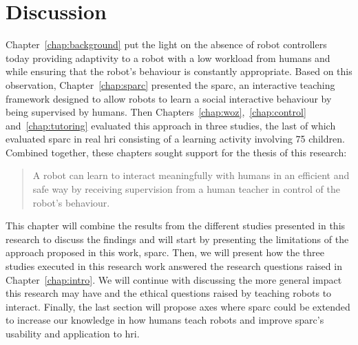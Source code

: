 \chapter{Discussion} \label{chap:discussion}
\glsresetall

Chapter~\ref{chap:background} put the light on the absence of robot controllers today providing adaptivity to a robot with a low workload from humans and while ensuring that the robot's behaviour is constantly appropriate. Based on this observation, Chapter~\ref{chap:sparc} presented the \gls{sparc}, an interactive teaching framework designed to allow robots to learn a social interactive behaviour by being supervised by humans. Then Chapters~\ref{chap:woz},~\ref{chap:control} and~\ref{chap:tutoring} evaluated this approach in three studies, the last of which evaluated \gls{sparc} in real \gls{hri} consisting of a learning activity involving 75 children. Combined together, these chapters sought support for the thesis of this research:

\begin{quote}
	A robot can learn to interact meaningfully with humans in an efficient and safe way by receiving supervision from a human teacher in control of the robot's behaviour.
\end{quote}

This chapter will combine the results from the different studies presented in this research to discuss the findings and will start by presenting the limitations of the approach proposed in this work, \gls{sparc}. Then, we will present how the three studies executed in this research work answered the research questions raised in Chapter~\ref{chap:intro}. We will continue with discussing the more general impact this research may have and the ethical questions raised by teaching robots to interact.
Finally, the last section will propose axes where \gls{sparc} could be extended to increase our knowledge in how humans teach robots and improve \gls{sparc}'s usability and application to \gls{hri}.


